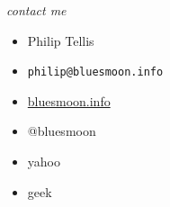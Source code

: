 \documentclass{beamer}
\begin{document}
\begin{frame}{\textit{contact me}}
  \begin{itemize}
  \item Philip Tellis
  \item \small{\texttt{philip@bluesmoon.info}}
  \item \href{http://bluesmoon.info/}{bluesmoon.info}
  \item @bluesmoon
  \item yahoo
  \item geek
  \end{itemize}
\end{frame}
\end{document}

